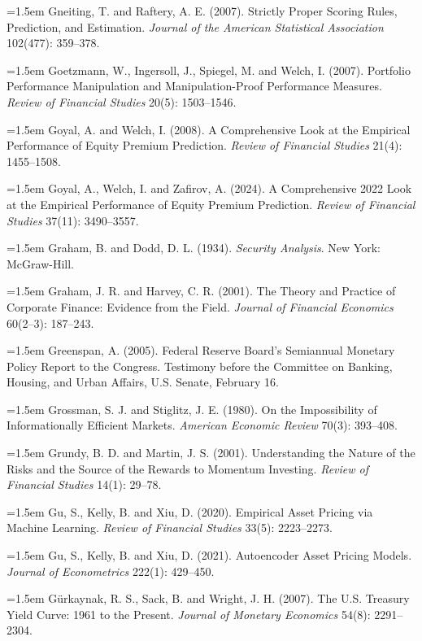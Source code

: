 \hangindent=1.5em Gneiting, T. and Raftery, A. E. (2007). Strictly Proper Scoring Rules, Prediction, and Estimation. \emph{Journal of the American Statistical Association} 102(477): 359--378.

\hangindent=1.5em Goetzmann, W., Ingersoll, J., Spiegel, M. and Welch, I. (2007). Portfolio Performance Manipulation and Manipulation-Proof Performance Measures. \emph{Review of Financial Studies} 20(5): 1503--1546.

\hangindent=1.5em Goyal, A. and Welch, I. (2008). A Comprehensive Look at the Empirical Performance of Equity Premium Prediction. \emph{Review of Financial Studies} 21(4): 1455--1508.

\hangindent=1.5em Goyal, A., Welch, I. and Zafirov, A. (2024). A Comprehensive 2022 Look at the Empirical Performance of Equity Premium Prediction. \emph{Review of Financial Studies} 37(11): 3490--3557.

\hangindent=1.5em Graham, B. and Dodd, D. L. (1934). \emph{Security Analysis}. New York: McGraw-Hill.

\hangindent=1.5em Graham, J. R. and Harvey, C. R. (2001). The Theory and Practice of Corporate Finance: Evidence from the Field. \emph{Journal of Financial Economics} 60(2--3): 187--243.

\hangindent=1.5em Greenspan, A. (2005). Federal Reserve Board's Semiannual Monetary Policy Report to the Congress. Testimony before the Committee on Banking, Housing, and Urban Affairs, U.S. Senate, February 16.

\hangindent=1.5em Grossman, S. J. and Stiglitz, J. E. (1980). On the Impossibility of Informationally Efficient Markets. \emph{American Economic Review} 70(3): 393--408.

\hangindent=1.5em Grundy, B. D. and Martin, J. S. (2001). Understanding the Nature of the Risks and the Source of the Rewards to Momentum Investing. \emph{Review of Financial Studies} 14(1): 29--78.

\hangindent=1.5em Gu, S., Kelly, B. and Xiu, D. (2020). Empirical Asset Pricing via Machine Learning. \emph{Review of Financial Studies} 33(5): 2223--2273.

\hangindent=1.5em Gu, S., Kelly, B. and Xiu, D. (2021). Autoencoder Asset Pricing Models. \emph{Journal of Econometrics} 222(1): 429--450.

\hangindent=1.5em G\"urkaynak, R. S., Sack, B. and Wright, J. H. (2007). The U.S. Treasury Yield Curve: 1961 to the Present. \emph{Journal of Monetary Economics} 54(8): 2291--2304.

